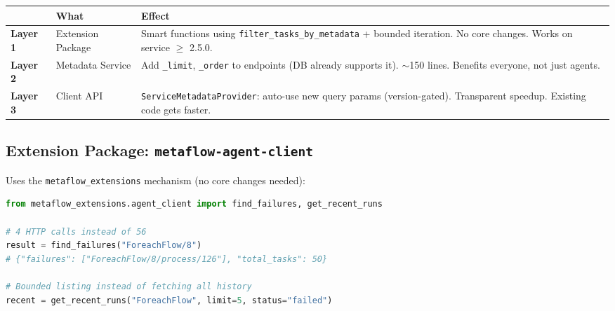 \documentclass[11pt,a4paper]{article}
\begin{document}
\begin{center}
\renewcommand{\arraystretch}{1.6}
\begin{tabular}{@{}p{1.8cm}p{3.4cm}p{9.2cm}@{}}
\toprule
& \textbf{What} & \textbf{Effect} \\
\midrule
\colorbox{mfgreen}{\color{white}\small\bfseries Layer 1}
  & Extension Package
  & Smart functions using \texttt{filter\_tasks\_by\_metadata} + bounded iteration.
    \textcolor{mfgreen}{No core changes. Works on service $\geq$ 2.5.0.} \\
\colorbox{mfpurple}{\color{white}\small\bfseries Layer 2}
  & Metadata Service
  & Add \texttt{\_limit}, \texttt{\_order} to endpoints (DB already supports it).
    \textcolor{mfpurple}{$\sim$150 lines. Benefits everyone, not just agents.} \\
\colorbox{mfblue}{\color{white}\small\bfseries Layer 3}
  & Client API
  & \texttt{ServiceMetadataProvider}: auto-use new query params (version-gated).
    \textcolor{mfblue}{Transparent speedup. Existing code gets faster.} \\
\bottomrule
\end{tabular}
\renewcommand{\arraystretch}{1}
\end{center}

\subsection{Extension Package: \texttt{metaflow-agent-client}}

Uses the \texttt{metaflow\_extensions} mechanism (no core changes needed):

\begin{lstlisting}[language=Python]
from metaflow_extensions.agent_client import find_failures, get_recent_runs

# 4 HTTP calls instead of 56
result = find_failures("ForeachFlow/8")
# {"failures": ["ForeachFlow/8/process/126"], "total_tasks": 50}

# Bounded listing instead of fetching all history
recent = get_recent_runs("ForeachFlow", limit=5, status="failed")
\end{lstlisting}
\end{document}
